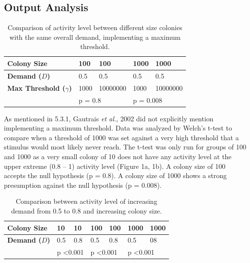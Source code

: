 \documentclass[a4paper]{article}
\begin{document}
\begin{figure}[!ht]
\end{figure}





\subsection{Output Analysis}
\begin{table}[H]
\caption{Comparison of activity level between different size colonies with the same overall demand, implementing a maximum threshold.}\label{table:4}
\begin{tabular}{|l|l|l|l|l|}
\hline
\textbf{Colony Size}   & 100         & 100            & 1000         & 1000            \\ \hline
\textbf{Demand ($D$)}        & 0.5         & 0.5            & 0.5          & 0.5             \\ \hline
\textbf{Max Threshold ($\gamma$)} & 1000        & 10000000       & 1000         & 10000000        \\ \hline
                       & \multicolumn{2}{l|}{p = 0.8} & \multicolumn{2}{l|}{p = 0.008} \\ \hline
\end{tabular}
\end{table}



As mentioned in 5.3.1, Gautrais \textit{et al.}, 2002 did not explicitly mention implementing a maximum threshold.  Data was analyzed by Welch’s t-test to compare when a threshold of 1000 was set against a very high threshold that a stimulus would most likely never reach.   The t-test was only run for groups of 100 and 1000 as a very small colony of 10 does not have any activity level at the upper extreme (0.8 – 1) activity level (Figure 1a, 1b).  A colony size of 100 accepts the null hypothesis (p = 0.8).  A colony size of 1000 shows a strong presumption against the null hypothesis (p = 0.008).  


\begin{table}[H]
\caption{Comparison between activity level of increasing demand from 0.5 to 0.8 and increasing colony size.}
\label{table:5}
\begin{tabular}{|l|l|l|l|l|l|l|}
\hline
\textbf{Colony Size} & 10                 & 10                & 100                & 100               & 1000               & 1000              \\ \hline
\textbf{Demand ($D$)}      & 0.5                & 0.8               & 0.5                & 0.8               & 0.5                & 08                \\ \hline
                     & \multicolumn{2}{l|}{p \textless 0.001} & \multicolumn{2}{l|}{p \textless 0.001} & \multicolumn{2}{l|}{p \textless 0.001} \\ \hline
\end{tabular}
\end{table}
\end{document}
